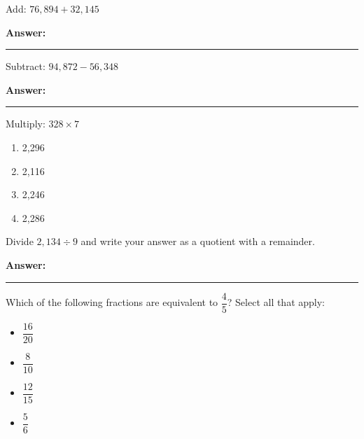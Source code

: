 \documentclass[12pt]{article}
\begin{document}
\begin{tcolorbox}[colframe=black!50, colback=white, title=\textbf{Problem 3}]
Add: \(76,894 + 32,145\)

\vspace{3.5cm}
\textbf{Answer:}  
\rule{0.7\textwidth}{0.4mm}
\end{tcolorbox}

\begin{tcolorbox}[colframe=black!50, colback=white, title=\textbf{Problem 4}]
Subtract: \(94,872 - 56,348\)

\vspace{2cm}
\textbf{Answer:}  
\rule{0.7\textwidth}{0.4mm}
\end{tcolorbox}

\begin{tcolorbox}[colframe=black!50, colback=white, title=\textbf{Problem 5}]
Multiply: \(328 \times 7\)
\begin{enumerate}[label=(\Alph*)]
    \item 2,296
    \item 2,116
    \item 2,246
    \item 2,286
\end{enumerate}
\end{tcolorbox}

\begin{tcolorbox}[colframe=black!50, colback=white, title=\textbf{Problem 6}]
Divide \(2,134 \div 9\) and write your answer as a quotient with a remainder.

\vspace{3cm}
\textbf{Answer:}  
\rule{0.7\textwidth}{0.4mm}
\end{tcolorbox}

\begin{tcolorbox}[colframe=black!50, colback=white, title=\textbf{Problem 7}]
Which of the following fractions are equivalent to \(\dfrac{4}{5}\)? Select all that apply:
\begin{itemize}[label=$\Box$]
    \item \(\dfrac{16}{20}\)
    \item \(\dfrac{8}{10}\)
    \item \(\dfrac{12}{15}\)
    \item \(\dfrac{5}{6}\)
\end{itemize}
\end{tcolorbox}
\end{document}
